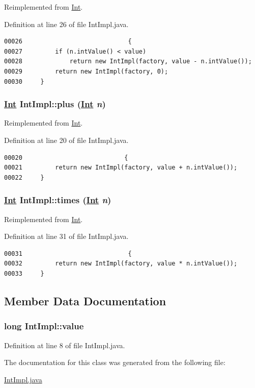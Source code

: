 Reimplemented from \hyperlink{interfaceInt_a3}{Int}.

Definition at line 26 of file Int\-Impl.java.\footnotesize\begin{verbatim}00026                             {
00027         if (n.intValue() < value)
00028             return new IntImpl(factory, value - n.intValue());
00029         return new IntImpl(factory, 0);
00030     }
\end{verbatim}\normalsize 
\hypertarget{classIntImpl_a1}{
\subsubsection[plus]{\setlength{\rightskip}{0pt plus 5cm}\hyperlink{interfaceInt}{Int} Int\-Impl::plus (\hyperlink{interfaceInt}{Int} {\em n})}}
\label{classIntImpl_a1}




Reimplemented from \hyperlink{interfaceInt_a1}{Int}.

Definition at line 20 of file Int\-Impl.java.\footnotesize\begin{verbatim}00020                            {
00021         return new IntImpl(factory, value + n.intValue());
00022     }
\end{verbatim}\normalsize 
\hypertarget{classIntImpl_a4}{
\subsubsection[times]{\setlength{\rightskip}{0pt plus 5cm}\hyperlink{interfaceInt}{Int} Int\-Impl::times (\hyperlink{interfaceInt}{Int} {\em n})}}
\label{classIntImpl_a4}




Reimplemented from \hyperlink{interfaceInt_a4}{Int}.

Definition at line 31 of file Int\-Impl.java.\footnotesize\begin{verbatim}00031                             {
00032         return new IntImpl(factory, value * n.intValue());
00033     }
\end{verbatim}\normalsize 


\subsection{Member Data Documentation}
\hypertarget{classIntImpl_o0}{
\subsubsection[value]{\setlength{\rightskip}{0pt plus 5cm}long Int\-Impl::value}}
\label{classIntImpl_o0}




Definition at line 8 of file Int\-Impl.java.

The documentation for this class was generated from the following file:\begin{CompactItemize}
\item 
\hyperlink{IntImpl_8java-source}{Int\-Impl.java}\end{CompactItemize}
